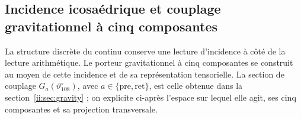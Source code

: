\subsection{Incidence icosaédrique et couplage gravitationnel à cinq composantes}
\label{ii:sec:ii-pentadica}

La structure discrète du continu conserve une lecture d’incidence
à côté de la lecture arithmétique. Le porteur gravitationnel à cinq composantes se
construit au moyen de cette incidence et de sa représentation tensorielle. La section
de couplage \(G_a(\vartheta^\circ_{108})\), avec
\(a\in\{\mathrm{pre},\mathrm{ret}\}\), est celle obtenue dans la
section~\ref{ii:sec:gravity} ; on explicite ci-après l’espace sur
lequel elle agit, ses cinq composantes et sa projection transversale.

